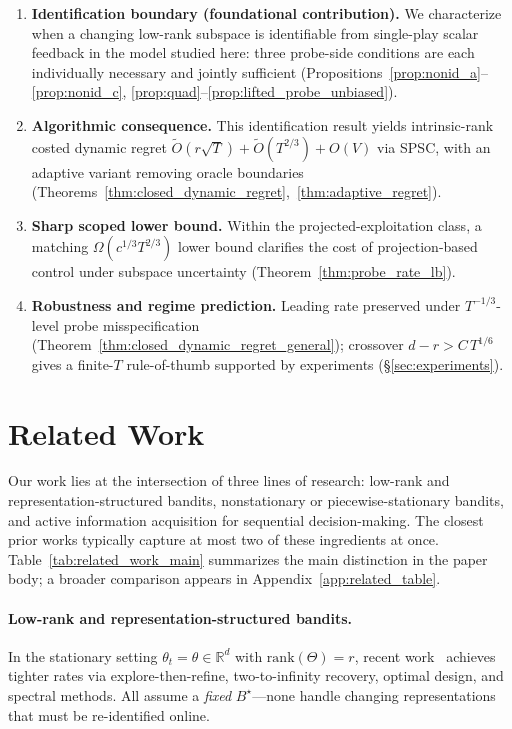 \documentclass{article}
\newcommand{\R}{\mathbb{R}}
\newcommand{\rank}{\mathrm{rank}}
\begin{document}
  \begin{enumerate}[leftmargin=1.5em, itemsep=2pt]
  \item \textbf{Identification boundary (foundational contribution).}
  We characterize when a changing low-rank subspace is identifiable from single-play scalar feedback in the model studied here: three probe-side conditions are each individually necessary and jointly sufficient
  (Propositions~\ref{prop:nonid_a}--\ref{prop:nonid_c}, \ref{prop:quad}--\ref{prop:lifted_probe_unbiased}).

  \item \textbf{Algorithmic consequence.}
  This identification result yields intrinsic-rank costed dynamic regret $\widetilde{O}(r\sqrt{T}) + \widetilde{O}(T^{2/3}) + O(V)$ via SPSC, with an adaptive variant removing oracle boundaries
  (Theorems~\ref{thm:closed_dynamic_regret},~\ref{thm:adaptive_regret}).

  \item \textbf{Sharp scoped lower bound.}
  Within the projected-exploitation class, a matching $\Omega(c^{1/3}T^{2/3})$ lower bound clarifies the cost of projection-based control under subspace uncertainty
  (Theorem~\ref{thm:probe_rate_lb}).

  \item \textbf{Robustness and regime prediction.}
  Leading rate preserved under $T^{-1/3}$-level probe misspecification (Theorem~\ref{thm:closed_dynamic_regret_general}); crossover $d - r > C\,T^{1/6}$ gives a finite-$T$ rule-of-thumb supported by experiments (\S\ref{sec:experiments}).
  \end{enumerate}

\section{Related Work}
\label{sec:related}

Our work lies at the intersection of three lines of research: low-rank and representation-structured bandits, nonstationary or piecewise-stationary bandits, and active information acquisition for sequential decision-making.
The closest prior works typically capture at most two of these ingredients at once.
Table~\ref{tab:related_work_main} summarizes the main distinction in the paper body; a broader comparison appears in Appendix~\ref{app:related_table}.

\paragraph{Low-rank and representation-structured bandits.}
In the stationary setting $\theta_t = \theta \in \R^d$ with $\rank(\Theta) = r$,
recent work~\citep{kang2022gestt, pmlr-v235-jedra24a, pmlr-v235-jang24e, stojanovic2023spectral} achieves tighter rates via explore-then-refine, two-to-infinity recovery, optimal design, and spectral methods. All assume a \emph{fixed} $B^\star$---none handle changing representations that must be re-identified online.
\end{document}
